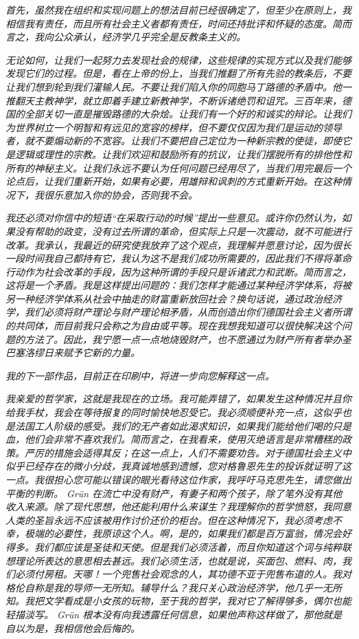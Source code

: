 \documentclass[DIV=12,%
               BCOR=0mm,%
               headinclude=false,%
               footinclude=false,open=any,%
               fontsize=10pt,%
               oneside,%
               paper=210mm:11in]%
               {scrbook}
\begin{document}
\emph{首先，虽然我在组织和实现问题上的想法目前已经很确定了，但至少在原则上，我相信我有责任，而且所有社会主义者都有责任，时间还持批评和怀疑的态度。简而言之，我向公众承认，经济学几乎完全是反教条主义的。}


\emph{无论如何，让我们一起努力去发现社会的规律，这些规律的实现方式以及我们能够发现它们的过程。但是，看在上帝的份上，当我们推翻了所有先验的教条后，不要让我们想到轮到我们灌输人民。不要让我们陷入你的同胞马丁路德的矛盾中。他一推翻天主教神学，就立即着手建立新教神学，不断诉诸绝罚和诅咒。三百年来，德国的全部关切一直是摧毁路德的大杂烩。让我们有一个好的和诚实的辩论。让我们为世界树立一个明智和有远见的宽容的榜样，但不要仅仅因为我们是运动的领导者，就不要煽动新的不宽容。让我们不要把自己定位为一种新宗教的使徒，即使它是逻辑或理性的宗教。让我们欢迎和鼓励所有的抗议，让我们摆脱所有的排他性和所有的神秘主义。让我们永远不要认为任何问题已经用尽了，当我们用完最后一个论点后，让我们重新开始，如果有必要，用雄辩和讽刺的方式重新开始。在这种情况下，我很乐意加入你的协会，否则我不会。}


\emph{我还必须对你信中的短语“在采取行动的时候”提出一些意见。或许你仍然认为，如果没有帮助的政变，没有过去所谓的革命，但实际上只是一次震动，就不可能进行改革。我承认，我最近的研究使我放弃了这个观点，我理解并愿意讨论，因为很长一段时间我自己都持有它，我认为这不是我们成功所需要的，因此我们不得将革命行动作为社会改革的手段，因为这种所谓的手段只是诉诸武力和武断。简而言之，这将是一个矛盾。我是这样提出问题的：我们怎样才能通过某种经济学体系，将被另一种经济学体系从社会中抽走的财富重新放回社会？换句话说，通过政治经济学，我们必须将财产理论与财产理论相矛盾，从而创造出你们德国社会主义者所谓的共同体，而目前我只会称之为自由或平等。现在我想我知道可以很快解决这个问题的方法了。因此，我宁愿一点一点地烧毁财产，也不愿通过为财产所有者举办圣巴塞洛缪日来赋予它新的力量。}


\emph{我的下一部作品，目前正在印刷中，将进一步向您解释这一点。}


\emph{我亲爱的哲学家，这就是我现在的立场。我可能弄错了，如果发生这种情况并且你给我手杖，我会在等待报复的同时愉快地忍受它。我必须顺便补充一点，这似乎也是法国工人阶级的感受。我们的无产者如此渴求知识，如果我们能给他们喝的只是血，他们会非常不喜欢我们。简而言之，在我看来，使用灭绝语言是非常糟糕的政策。严厉的措施会适得其反；在这一点上，人们不需要劝告。对于德国社会主义中似乎已经存在的微小分歧，我真诚地感到遗憾，您对格鲁恩先生的投诉就证明了这一点。我很担心您可能以错误的眼光看待这位作家，我呼吁马克思先生，请您做出平衡的判断。 Grün 在流亡中没有财产，有妻子和两个孩子，除了笔外没有其他收入来源。除了现代思想，他还能利用什么来谋生？我理解你的哲学愤怒，我同意人类的圣旨永远不应该被用作讨价还价的柜台。但在这种情况下，我必须考虑不幸，极端的必要性，我原谅这个人。啊，是的，如果我们都是百万富翁，情况会好得多。我们都应该是圣徒和天使。但是我们必须活着，而且你知道这个词与纯粹联想理论所表达的意思相去甚远。我们必须生活，也就是说，买面包、燃料、肉，我们必须付房租。天哪！一个兜售社会观念的人，其功德不亚于兜售布道的人。我对格伦自称是我的导师一无所知。辅导什么？我只关心政治经济学，他几乎一无所知。我把文学看成是小女孩的玩物，至于我的哲学，我对它了解得够多，偶尔也能轻描淡写。 Grün 根本没有向我透露任何信息，如果他声称这样做了，那他就是自以为是，我相信他会后悔的。}
\end{document}
